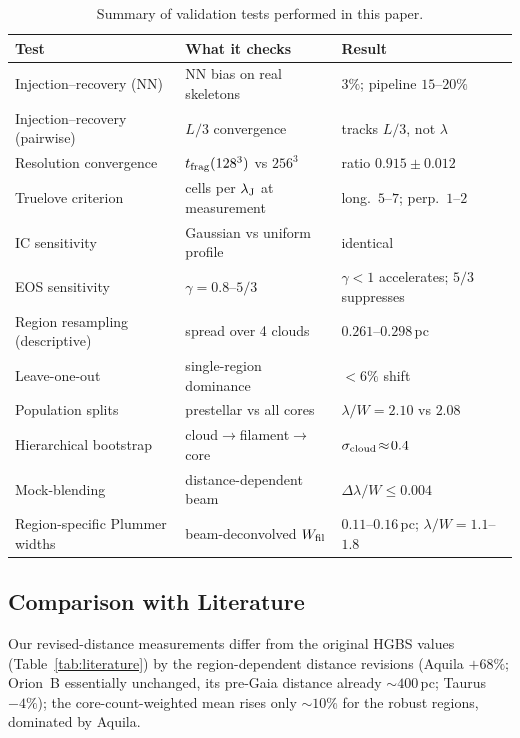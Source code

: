 \documentclass[usenatbib,twoside,twocolumn]{mnras}
\begin{document}
\begin{table}
\caption{Summary of validation tests performed in this paper.}
\label{tab:validation_summary}
\footnotesize
\setlength{\tabcolsep}{3pt}
\begin{tabular}{p{2.4cm}p{2.8cm}p{2.0cm}}
\toprule
Test & What it checks & Result \\
\midrule
Injection--recovery (NN) & NN bias on real skeletons & $3\%$; pipeline $15$--$20\%$ \\
Injection--recovery (pairwise) & $L/3$ convergence & tracks $L/3$, not $\lambda$ \\
Resolution convergence & $t_{\rm frag}(128^3)$ vs $256^3$ & ratio $0.915\pm0.012$ \\
Truelove criterion & cells per $\lambda_{\rm J}$ at measurement & long.\ $5$--$7$; perp.\ $1$--$2$ \\
IC sensitivity & Gaussian vs uniform profile & identical \\
EOS sensitivity & $\gamma=0.8$--$5/3$ & $\gamma<1$ accelerates; $5/3$ suppresses \\
Region resampling (descriptive) & spread over 4 clouds & $0.261$--$0.298$\,pc \\
Leave-one-out & single-region dominance & $<6\%$ shift \\
Population splits & prestellar vs all cores & $\lambda/W\!=\!2.10$ vs $2.08$ \\
Hierarchical bootstrap & cloud$\to$filament$\to$core & $\sigma_{\rm cloud}\!\approx\!0.4$ \\
Mock-blending & distance-dependent beam & $\Delta\lambda/W\!\le\!0.004$ \\
Region-specific Plummer widths & beam-deconvolved $W_{\rm fil}$ & $0.11$--$0.16$\,pc; $\lambda/W\!=\!1.1$--$1.8$ \\
\bottomrule
\end{tabular}
\end{table}

\subsection{Comparison with Literature}

Our revised-distance measurements differ from the original HGBS values (Table~\ref{tab:literature}) by the region-dependent distance revisions (Aquila $+68\%$; Orion~B essentially unchanged, its pre-Gaia distance already $\sim400$\,pc; Taurus $-4\%$); the core-count-weighted mean rises only $\sim10\%$ for the robust regions, dominated by Aquila.
\end{document}
